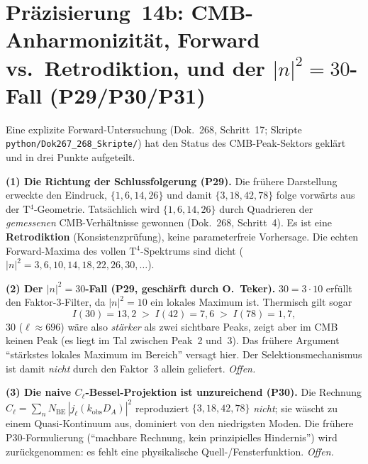 \section{\texorpdfstring{Präzisierung~14b: CMB-Anharmonizität, Forward vs.\ Retrodiktion, und der $|n|^2=30$-Fall (P29/P30/P31)}{Praezisierung 14b: CMB-Anharmonizitaet, Forward vs Retrodiktion}}

Eine explizite Forward-Untersuchung (Dok.~268, Schritt~17; Skripte
\texttt{python/Dok267\_268\_Skripte/}) hat den Status des CMB-Peak-Sektors geklärt und
in drei Punkte aufgeteilt.

\textbf{(1) Die Richtung der Schlussfolgerung (P29).}
Die frühere Darstellung erweckte den Eindruck, $\{1,6,14,26\}$ und damit
$\{3,18,42,78\}$ folge vorwärts aus der T$^4$-Geometrie. Tatsächlich wird
$\{1,6,14,26\}$ durch Quadrieren der \emph{gemessenen} CMB-Verhältnisse
gewonnen (Dok.~268, Schritt~4). Es ist eine \textbf{Retrodiktion}
(Konsistenzprüfung), keine parameterfreie Vorhersage. Die echten
Forward-Maxima des vollen T$^4$-Spektrums sind dicht
($|n|^2=3,6,10,14,18,22,26,30,\ldots$).

\textbf{(2) Der $|n|^2=30$-Fall (P29, geschärft durch O.~Teker).}
$30=3\cdot10$ erfüllt den Faktor-3-Filter, da $|n|^2=10$ ein lokales
Maximum ist. Thermisch gilt sogar
\[
  I(30)=13{,}2 \;>\; I(42)=7{,}6 \;>\; I(78)=1{,}7,
\]
$30$ ($\ell\approx696$) wäre also \emph{stärker} als zwei sichtbare Peaks,
zeigt aber im CMB keinen Peak (es liegt im Tal zwischen Peak~2 und~3). Das
frühere Argument ``stärkstes lokales Maximum im Bereich'' versagt hier. Der
Selektionsmechanismus ist damit \emph{nicht} durch den Faktor~3 allein
geliefert. \emph{Offen.}

\textbf{(3) Die naive $C_\ell$-Bessel-Projektion ist unzureichend (P30).}
Die Rechnung $C_\ell=\sum_n N_\mathrm{BE}\,|j_\ell(k_\mathrm{obs}D_A)|^2$
reproduziert $\{3,18,42,78\}$ \emph{nicht}; sie wäscht zu einem
Quasi-Kontinuum aus, dominiert von den niedrigsten Moden. Die frühere
P30-Formulierung (``machbare Rechnung, kein prinzipielles Hindernis'') wird
zurückgenommen: es fehlt eine physikalische Quell-/Fensterfunktion. \emph{Offen.}

